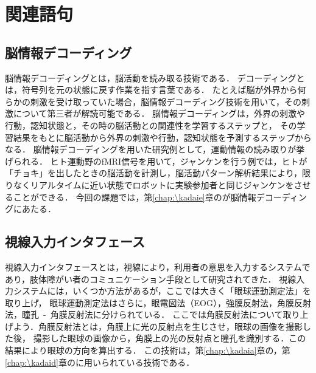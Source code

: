 \chapter{関連語句}
\section{脳情報デコーディング}
脳情報デコーディングとは，脳活動を読み取る技術である．
デコーディングとは，符号列を元の状態に戻す作業を指す言葉である．
たとえば脳が外界から何らかの刺激を受け取っていた場合，脳情報デコーディング技術を用いて，その刺激について第三者が解読可能である．
脳情報デコーディングは，外界の刺激や行動，認知状態と，その時の脳活動との関連性を学習するステップと，
その学習結果をもとに脳活動から外界の刺激や行動，認知状態を予測するステップからなる．
脳情報デコーディングを用いた研究例として，運動情報の読み取りが挙げられる．
ヒト運動野のfMRI信号を用いて，ジャンケンを行う例では，ヒトが「チョキ」を出したときの脳活動を計測し，脳活動パターン解析結果により，限りなくリアルタイムに近い状態でロボットに実験参加者と同じジャンケンをさせることができる．
今回の課題では，第\ref{chap:\kadaie}章の\kadaie が脳情報デコーディングにあたる．\\
\hfill\cite{脳情報デコーディング技術とその応用}
\section{視線入力インタフェース}
視線入力インタフェースとは，視線により，利用者の意思を入力するシステムであり，肢体障がい者のコミュニケーション手段として研究されてきた．
視線入力システムには，いくつか方法があるが，ここでは大きく「眼球運動測定法」を取り上げ，
眼球運動測定法はさらに，眼電図法（EOG），強膜反射法，角膜反射法，瞳孔\ -\ 角膜反射法に分けられている．
ここでは角膜反射法について取り上げよう．角膜反射法とは，角膜上に光の反射点を生じさせ，眼球の画像を撮影した後，
撮影した眼球の画像から，角膜上の光の反射点と瞳孔を識別する．この結果により眼球の方向を算出する．
この技術は，第\ref{chap:\kadaia}章の\elt ，第\ref{chap:\kadaid}章の\tobi に用いられている技術である．\\
\hfill\cite{weko_847_1}


